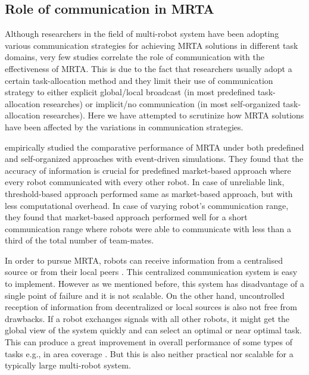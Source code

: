 \documentclass{intech}
\begin{document}
\subsection{Role of communication in MRTA}
Although researchers in the field of multi-robot system have been adopting various communication strategies for achieving MRTA solutions in different task domains, very few studies correlate the role of communication with the effectiveness of MRTA. This is due to the fact that researchers usually adopt a certain task-allocation method and they limit their use of communication strategy to either explicit global/local broadcast (in most predefined task-allocation researches) or  implicit/no communication (in most self-organized task-allocation researches). Here we have attempted to scrutinize how MRTA solutions have been affected by the variations in communication strategies.

\cite{kalra+2007} empirically studied the comparative performance of MRTA under both predefined and self-organized approaches with event-driven simulations. They found that the accuracy of information is crucial for predefined market-based approach where every robot communicated with every other robot. In case of unreliable link, threshold-based approach performed same as market-based approach, but with less computational overhead. In case of varying robot's communication range,  they found that market-based approach performed well for a short communication range where robots were able to communicate with less than a third of the total number of team-mates. 
  
In order to pursue MRTA, robots can receive information from a centralised source \cite{Krieger+2000} or from their local peers \citep{Agassounon+2002}. This centralized communication system is easy to implement. However as we mentioned before, this system has disadvantage of a single point of failure and it is not scalable. On the other hand, uncontrolled reception of information from decentralized or local sources is also not free from drawbacks. If a robot exchanges signals with all other robots, it might get the global view of the system quickly and can select an optimal or near optimal task. This can produce a great improvement in overall performance of some types of tasks e.g., in area coverage \cite{Rutishauser+2009}. But this is also neither practical nor scalable for a typically large multi-robot system.
\end{document}
